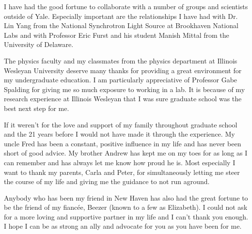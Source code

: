 I have had the good fortune to collaborate with a number of groups and scientists outside of Yale.
Especially important are the relationships I have had with Dr. Lin Yang from the National Synchrotron Light Source at Brookhaven National Labs and with Professor Eric Furst and his student Manish Mittal from the University of Delaware.

The physics faculty and my classmates from the physics department at Illinois Wesleyan University deserve many thanks for providing a great environment for my undergraduate education.
I am particularly appreciative of Professor Gabe Spalding for giving me so much exposure to working in a lab.
It is because of my research experience at Illinois Wesleyan that I was sure graduate school was the best next step for me.

If it weren't for the love and support of my family throughout graduate school and the 21 years before I would not have made it through the experience.
My uncle Fred has been a constant, positive influence in my life and has never been short of good advice.
My brother Andrew has kept me on my toes for as long as I can remember and has always let me know how proud he is.
Most especially I want to thank my parents, Carla and Peter, for simultaneously letting me steer the course of my life and giving me the guidance to not run aground.

Anybody who has been my friend in New Haven has also had the great fortune to be the friend of my fianc\'{e}e, Beezer (known to a few as Elizabeth).
I could not ask for a more loving and supportive partner in my life and I can't thank you enough.
I hope I can be as strong an ally and advocate for you as you have been for me.